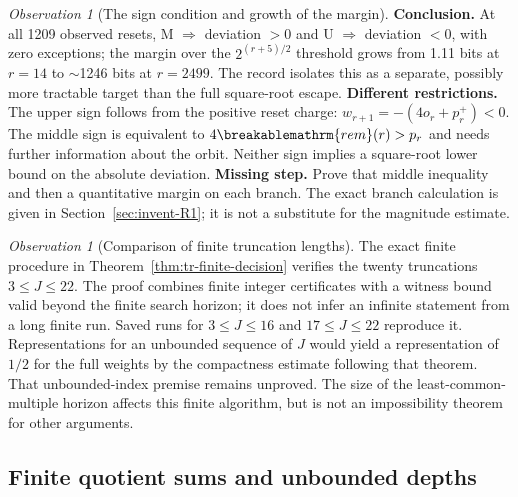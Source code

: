 \documentclass[11pt]{article}
\theoremstyle{plain}
\theoremstyle{definition}
\theoremstyle{remark}
\newtheorem{obs}[thm]{Observation}
\renewcommand{\mathrm}[1]{\ifmmode\breakablemathrm{#1}\else\textrm{#1}\fi}%
\begin{document}
\begin{obs}[The sign condition and growth of the margin]
\textbf{Conclusion.} At all 1209 observed resets, M $\Rightarrow$ deviation $>0$ and U $\Rightarrow$
deviation $<0$, with zero exceptions; the margin over the $2^{(r+5)/2}$ threshold grows from
1.11 bits at $r=14$ to $\sim$1246 bits at $r=2499$. The record isolates this as a separate,
possibly more tractable target than the full square-root escape.
\textbf{Different restrictions.} The upper sign follows from the
positive reset charge: $w_{r+1}=-(4o_r+p_r^+)<0$.
The middle sign is equivalent to $4\mathrm{rem}(r)>p_r$ and needs
further information about the orbit.  Neither sign implies a
square-root lower bound on the absolute deviation.
\textbf{Missing step.} Prove that middle inequality and then a
quantitative margin on each branch.  The exact branch calculation
is given in Section~\ref{sec:invent-R1}; it is not a substitute for
the magnitude estimate.
\end{obs}

\begin{obs}[Comparison of finite truncation lengths]
The exact finite procedure in
Theorem~\ref{thm:tr-finite-decision} verifies the twenty truncations
$3\le J\le22$.  The proof combines finite integer certificates with a
witness bound valid beyond the finite search horizon; it does not infer
an infinite statement from a long finite run.  Saved runs for
\href{https://github.com/wcook04/plectis-erdos/blob/f757115e03bebe5c04431a147da559015c680a37/research/experiments/erdos257/receipts/truncation-ladder-3-16.json}{$3\le J\le16$} and
\href{https://github.com/wcook04/plectis-erdos/blob/f757115e03bebe5c04431a147da559015c680a37/research/experiments/erdos257/receipts/truncation-ladder-17-22.json}{$17\le J\le22$} reproduce it.
Representations for an unbounded sequence of $J$ would yield a
representation of $1/2$ for the full weights by the compactness estimate
following that theorem.  That unbounded-index premise remains unproved.
The size of the least-common-multiple horizon affects this finite
algorithm, but is not an impossibility theorem for other arguments.
\end{obs}

\subsection{Finite quotient sums and unbounded depths}
\end{document}
